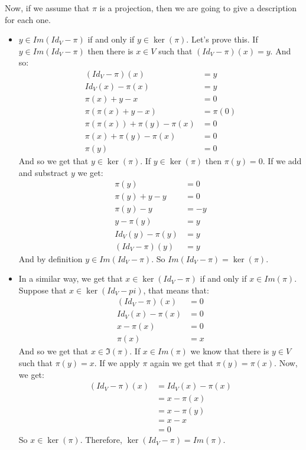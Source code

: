 \documentclass[final,expand]{problemset}
\begin{document}
{\begin{itemize}
	Now, if we assume that $\pi$ is a projection, then we are going to give a description for each one.
	\begin{itemize}
		\item $y \in Im(Id_V - \pi)$ if and only if $y \in \ker(\pi)$. Let's prove this. If $y \in Im(Id_V - \pi)$ then there is $x \in V$ such that $(Id_V - \pi)(x) = y$. And so:
		\begin{align*}
			(Id_V - \pi)(x) &= y\\
			Id_V(x) - \pi(x) &= y\\
			\pi(x) + y - x &=0\\
			\pi(\pi(x) + y - x) &= \pi(0)\\
			\pi(\pi(x)) + \pi(y) - \pi(x) &= 0\\
			\pi(x) + \pi(y) - \pi(x) &= 0\\
			\pi(y) &= 0
		\end{align*} 
		And so we get that $y \in \ker(\pi)$. If $y \in \ker(\pi)$ then $\pi(y) = 0$. If we add and substract $y$ we get:
		\begin{align*}
			\pi(y) &= 0\\
			\pi(y) + y - y &= 0\\
			\pi(y) - y &= -y\\
			y-\pi(y) &= y\\
			Id_V(y) - \pi(y) &= y\\
			(Id_V - \pi)(y) &= y
		\end{align*}
		And by definition $y \in Im(Id_V - \pi)$. So $Im(Id_V - \pi) = \ker(\pi)$.

		\item In a similar way, we get that $x \in \ker(Id_V - \pi)$ if and only if $x \in Im(\pi)$. Suppose that $x \in \ker(Id_V - pi)$, that means that:
		\begin{align*}
			(Id_V-\pi)(x) &= 0\\
			Id_V(x) - \pi(x) &= 0\\
			x - \pi(x) &= 0\\
			\pi(x) &= x
		\end{align*} 
		And so we get that $x \in \Im(\pi)$. If $x \in Im(\pi)$ we know that there is $y \in V$ such that $\pi(y) = x$. If we apply $\pi$ again we get that $\pi(y) = \pi(x)$. Now, we get:
		\begin{align*}
			(Id_V-\pi)(x) &= Id_V(x) - \pi(x)\\
			&= x - \pi(x)\\
			&= x - \pi(y)\\
			&= x - x\\
			&= 0
		\end{align*}
		So $x \in \ker(\pi)$. Therefore, $\ker(Id_V - \pi) = Im(\pi)$.
	\end{itemize}
	\end{itemize}
}
\end{document}
